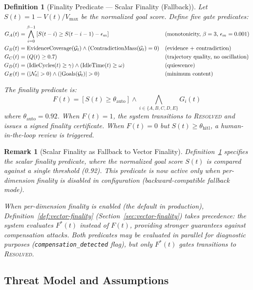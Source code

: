 \documentclass[11pt]{article}
\newtheorem{definition}{Definition}
\newtheorem{remark}{Remark}
\begin{document}
\begin{definition}[Finality Predicate — Scalar Finality (Fallback)]
\label{def:finality}
Let $S(t) = 1 - V(t) / V_{\max}$ be the normalized goal score. Define five gate predicates:
\begin{align}
G_A(t) &= \bigwedge_{i=0}^{\beta-1} \left[ S(t-i) \geq S(t-i-1) - \epsilon_m \right] && \text{(monotonicity, $\beta = 3$, $\epsilon_m = 0.001$)} \notag \\
G_B(t) &= \text{EvidenceCoverage}(\mathcal{G}_t) \wedge (\text{ContradictionMass}(\mathcal{G}_t) = 0) && \text{(evidence + contradiction)} \notag \\
G_C(t) &= (Q(t) \geq 0.7) && \text{(trajectory quality, no oscillation)} \notag \\
G_D(t) &= (\text{IdleCycles}(t) \geq \gamma) \wedge (\text{IdleTime}(t) \geq \omega) && \text{(quiescence)} \notag \\
G_E(t) &= (|\mathcal{N}_t| > 0) \wedge (|\text{Goals}(\mathcal{G}_t)| > 0) && \text{(minimum content)} \notag
\end{align}

The finality predicate is:
\[
F(t) = \left[ S(t) \geq \theta_{\text{auto}} \right] \wedge \bigwedge_{i \in \{A,B,C,D,E\}} G_i(t)
\]
where $\theta_{\text{auto}} = 0.92$. When $F(t) = 1$, the system transitions to \textnormal{\textsc{Resolved}} and issues a signed finality certificate. When $F(t) = 0$ but $S(t) \geq \theta_{\text{hitl}}$, a human-in-the-loop review is triggered.
\end{definition}

\begin{remark}[Scalar Finality as Fallback to Vector Finality]
Definition~\ref{def:finality} specifies the \emph{scalar} finality predicate, where the normalized
goal score $S(t)$ is compared against a single threshold (0.92). This predicate is now active only
when per-dimension finality is disabled in configuration (backward-compatible fallback mode).

When per-dimension finality is enabled (the default in production), Definition~\ref{def:vector-finality}
(Section~\ref{sec:vector-finality}) takes precedence: the system evaluates $F^*(t)$ instead of $F(t)$,
providing stronger guarantees against compensation attacks. Both predicates may be evaluated in parallel
for diagnostic purposes (\texttt{compensation\_detected} flag), but only $F^*(t)$ gates transitions to
\textnormal{\textsc{Resolved}}.
\end{remark}

\subsection{Threat Model and Assumptions}
\end{document}
